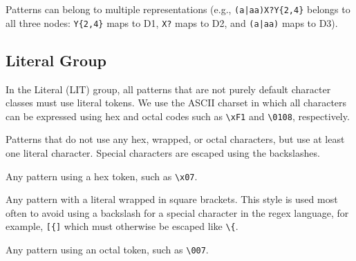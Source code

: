 Patterns can belong to multiple representations (e.g., \verb!(a|aa)X?Y{2,4}! belongs to all three nodes: \verb!Y{2,4}! maps to D1, \verb!X?! maps to D2, and \verb!(a|aa)! maps to D3).




\subsection{Literal Group}
In the Literal (LIT) group, all patterns that are not purely default character classes must use literal tokens.
We use the ASCII charset in which all characters can be expressed using hex and octal codes such as \verb!\xF1! and \verb!\0108!, respectively.



\begin{description} \itemsep -1pt
\item[T1:] Patterns that do not use any hex, wrapped, or octal characters, but use at least one literal character. Special characters are escaped using the backslashes.
\item[T2:] Any pattern using a hex token, such as \verb!\x07!.
\item[T3:] Any pattern with a literal wrapped in square brackets.
This style is used most often to avoid using a backslash for a special character in the regex language, for example, \verb![{]! which must otherwise be escaped like \verb!\{!.

\item[T4:] Any pattern using an octal token, such as \verb!\007!.
\end{description}

